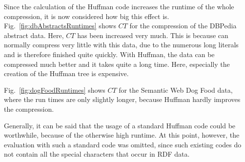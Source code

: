 Since the calculation of the Huffman code increases the runtime of the whole compression, it is now considered how big this effect is. Fig.~\ref{fig:dbAbstractsRuntimes} shows $CT$ for the compression of the DBPedia abstract data. Here, $CT$ has been increased very much. This is because \DHDT{} can normally compress very little with this data, due to the numerous long literals and is therefore finished quite quickly. With Huffman, the data can be compressed much better and it takes quite a long time. Here, especially the creation of the Huffman tree is expensive.

Fig.~\ref{fig:dogFoodRuntimes} shows $CT$ for the Semantic Web Dog Food data, where the run times are only slightly longer, because Huffman hardly improves the compression.

Generally, it can be said that the usage of a standard Huffman code could be worthwhile, because of the otherwise high runtime. At this point, however, the evaluation with such a standard code was omitted, since such existing codes do not contain all the special characters that occur in RDF data.


